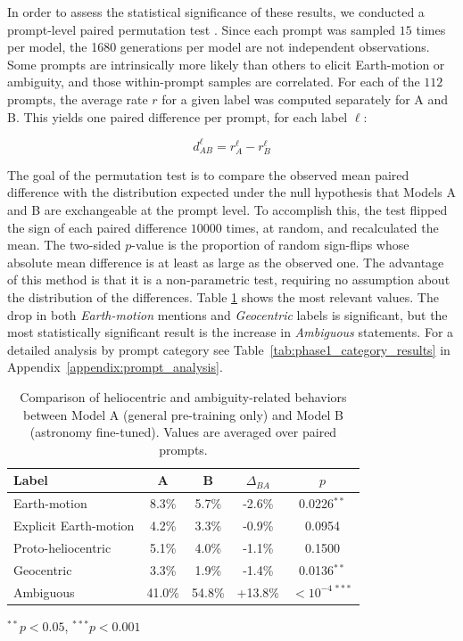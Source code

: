 In order to assess the statistical significance of these results, we conducted a prompt-level paired permutation test \cite{good2005permutation}. Since each prompt was sampled $15$ times per model, the 1680 generations per model are not independent observations. Some prompts are intrinsically more likely than others to elicit Earth-motion or ambiguity, and those within-prompt samples are correlated. For each of the $112$ prompts, the average rate $r$ for a given label was computed separately for A and B. This yields one paired difference per prompt, for each label $\ell$:

$$d^{\ell}_{AB} = r^{\ell}_{A} - r^{\ell}_{B}$$

The goal of the permutation test is to compare the observed mean paired difference with the distribution expected under the null hypothesis that Models A and B are exchangeable at the prompt level. To accomplish this, the test flipped the sign of each paired difference $10000$ times, at random, and recalculated the mean. The two-sided $p$-value is the proportion of random sign-flips whose absolute mean difference is at least as large as the observed one. The advantage of this method is that it is a non-parametric test, requiring no assumption about the distribution of the differences. Table \ref{tab:phase1_results} shows the most relevant values. The drop in both \textit{Earth-motion} mentions and \textit{Geocentric} labels is significant, but the most statistically significant result is the increase in \textit{Ambiguous} statements. For a detailed analysis by prompt category see Table~\ref{tab:phase1_category_results} in Appendix~\ref{appendix:prompt_analysis}. 


\begin{table}[t]
\centering
\setlength{\tabcolsep}{4pt}
\caption{Comparison of heliocentric and ambiguity-related behaviors between Model A (general pre-training only) and Model B (astronomy fine-tuned). Values are averaged over paired prompts.}
\label{tab:phase1_results}
\begin{tabular}{lcccc}
\hline
Label & A & B & $\Delta_{BA}$ & $p$ \\
\hline
Earth-motion          & 8.3\%  & 5.7\%    & -2.6\%  & 0.0226$^{**}$ \\
Explicit Earth-motion & 4.2\%  & 3.3\%    & -0.9\%  & 0.0954 \\
Proto-heliocentric    & 5.1\%  & 4.0\%    & -1.1\%  & 0.1500 \\
Geocentric            & 3.3\%  & 1.9\%    & -1.4\%  & 0.0136$^{**}$ \\
Ambiguous             & 41.0\% & 54.8\%   & +13.8\% & $<10^{-4\,***}$ \\
\hline
\end{tabular}
\vspace{0.5em}
\footnotesize{
$^{**} p < 0.05$, \quad
$^{***} p < 0.001$
}
\end{table}

